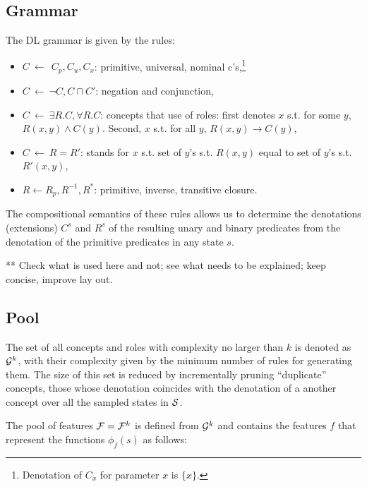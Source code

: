 \documentclass[letterpaper]{article} %
\begin{document}
\subsection{Grammar}

The DL grammar is given by the rules:

  \begin{itemize}
  \item $C \ \leftarrow\ \ C_p, C_u, C_x$: primitive, universal,  nominal c's,\footnote{Denotation of $C_x$ for parameter $x$ is $\{x\}$.}
  \item $C \ \leftarrow\  \neg C, C \sqcap C'$: negation and conjunction, 
  \item $C \ \leftarrow\  \exists R.C , \forall R.C$: concepts that use of  roles: first denotes $x$ s.t. for some  $y$,  $R(x,y) \land C(y)$.
  Second,  $x$ s.t. for all $y$, $R(x,y) \rightarrow C(y)$,
  \item $C \ \leftarrow\  R=R'$: stands for $x$ s.t. set of $y$'s  s.t. $R(x,y)$ equal to set of $y$'s s.t. $R'(x,y)$,
    \item $R \leftarrow R_p, R^{-1}, R^*$: primitive, inverse, transitive closure.
 \end{itemize}

The  compositional  semantics   of these rules allows us to determine the denotations (extensions)   $C^s$ and $R^s$  of
the resulting unary and binary predicates from the denotation of the primitive predicates in any  state $s$. 

** Check what is used here and not; see what needs to be explained; keep concise, improve lay out.


\subsection{Pool}


The set of all concepts and roles with complexity no larger than $k$ is denoted as ${\cal G}^k$,
with their complexity given by the minimum number of rules for generating them.
The size  of this set is reduced by incrementally pruning ``duplicate'' concepts,
those whose denotation coincides with the denotation of a another concept over all
the sampled states in ${\cal S}$. 

The pool of features ${\cal F}={\cal F}^k$  is defined from ${\cal G}^k$
and contains the  features $f$ that represent the functions $\phi_f(s)$
as follows:
\end{document}
